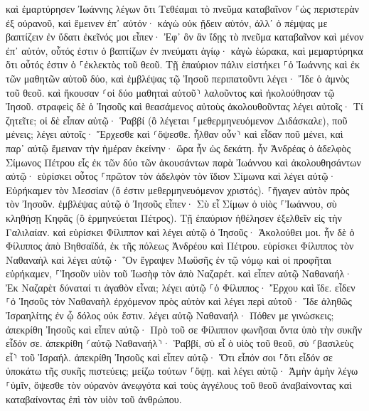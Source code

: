 \documentclass[twoside, 9pt]{extreport}
\begin{document}
καὶ ἐμαρτύρησεν Ἰωάννης λέγων ὅτι Τεθέαμαι τὸ πνεῦμα καταβαῖνον ⸀ὡς περιστερὰν ἐξ οὐρανοῦ, καὶ ἔμεινεν ἐπ᾽ αὐτόν· 
κἀγὼ οὐκ ᾔδειν αὐτόν, ἀλλ᾽ ὁ πέμψας με βαπτίζειν ἐν ὕδατι ἐκεῖνός μοι εἶπεν· Ἐφ᾽ ὃν ἂν ἴδῃς τὸ πνεῦμα καταβαῖνον καὶ μένον ἐπ᾽ αὐτόν, οὗτός ἐστιν ὁ βαπτίζων ἐν πνεύματι ἁγίῳ· 
κἀγὼ ἑώρακα, καὶ μεμαρτύρηκα ὅτι οὗτός ἐστιν ὁ ⸀ἐκλεκτὸς τοῦ θεοῦ. 
Τῇ ἐπαύριον πάλιν εἱστήκει ⸀ὁ Ἰωάννης καὶ ἐκ τῶν μαθητῶν αὐτοῦ δύο, 
καὶ ἐμβλέψας τῷ Ἰησοῦ περιπατοῦντι λέγει· Ἴδε ὁ ἀμνὸς τοῦ θεοῦ. 
καὶ ἤκουσαν ⸂οἱ δύο μαθηταὶ αὐτοῦ⸃ λαλοῦντος καὶ ἠκολούθησαν τῷ Ἰησοῦ. 
στραφεὶς δὲ ὁ Ἰησοῦς καὶ θεασάμενος αὐτοὺς ἀκολουθοῦντας λέγει αὐτοῖς· Τί ζητεῖτε; οἱ δὲ εἶπαν αὐτῷ· Ῥαββί (ὃ λέγεται ⸀μεθερμηνευόμενον Διδάσκαλε), ποῦ μένεις; 
λέγει αὐτοῖς· Ἔρχεσθε καὶ ⸂ὄψεσθε. ἦλθαν οὖν⸃ καὶ εἶδαν ποῦ μένει, καὶ παρ᾽ αὐτῷ ἔμειναν τὴν ἡμέραν ἐκείνην· ὥρα ἦν ὡς δεκάτη. 
ἦν Ἀνδρέας ὁ ἀδελφὸς Σίμωνος Πέτρου εἷς ἐκ τῶν δύο τῶν ἀκουσάντων παρὰ Ἰωάννου καὶ ἀκολουθησάντων αὐτῷ· 
εὑρίσκει οὗτος ⸀πρῶτον τὸν ἀδελφὸν τὸν ἴδιον Σίμωνα καὶ λέγει αὐτῷ· Εὑρήκαμεν τὸν Μεσσίαν (ὅ ἐστιν μεθερμηνευόμενον χριστός). 
⸀ἤγαγεν αὐτὸν πρὸς τὸν Ἰησοῦν. ἐμβλέψας αὐτῷ ὁ Ἰησοῦς εἶπεν· Σὺ εἶ Σίμων ὁ υἱὸς ⸀Ἰωάννου, σὺ κληθήσῃ Κηφᾶς (ὃ ἑρμηνεύεται Πέτρος). 
Τῇ ἐπαύριον ἠθέλησεν ἐξελθεῖν εἰς τὴν Γαλιλαίαν. καὶ εὑρίσκει Φίλιππον καὶ λέγει αὐτῷ ὁ Ἰησοῦς· Ἀκολούθει μοι. 
ἦν δὲ ὁ Φίλιππος ἀπὸ Βηθσαϊδά, ἐκ τῆς πόλεως Ἀνδρέου καὶ Πέτρου. 
εὑρίσκει Φίλιππος τὸν Ναθαναὴλ καὶ λέγει αὐτῷ· Ὃν ἔγραψεν Μωϋσῆς ἐν τῷ νόμῳ καὶ οἱ προφῆται εὑρήκαμεν, ⸀Ἰησοῦν υἱὸν τοῦ Ἰωσὴφ τὸν ἀπὸ Ναζαρέτ. 
καὶ εἶπεν αὐτῷ Ναθαναήλ· Ἐκ Ναζαρὲτ δύναταί τι ἀγαθὸν εἶναι; λέγει αὐτῷ ⸀ὁ Φίλιππος· Ἔρχου καὶ ἴδε. 
εἶδεν ⸀ὁ Ἰησοῦς τὸν Ναθαναὴλ ἐρχόμενον πρὸς αὐτὸν καὶ λέγει περὶ αὐτοῦ· Ἴδε ἀληθῶς Ἰσραηλίτης ἐν ᾧ δόλος οὐκ ἔστιν. 
λέγει αὐτῷ Ναθαναήλ· Πόθεν με γινώσκεις; ἀπεκρίθη Ἰησοῦς καὶ εἶπεν αὐτῷ· Πρὸ τοῦ σε Φίλιππον φωνῆσαι ὄντα ὑπὸ τὴν συκῆν εἶδόν σε. 
ἀπεκρίθη ⸂αὐτῷ Ναθαναήλ⸃· Ῥαββί, σὺ εἶ ὁ υἱὸς τοῦ θεοῦ, σὺ ⸂βασιλεὺς εἶ⸃ τοῦ Ἰσραήλ. 
ἀπεκρίθη Ἰησοῦς καὶ εἶπεν αὐτῷ· Ὅτι εἶπόν σοι ⸀ὅτι εἶδόν σε ὑποκάτω τῆς συκῆς πιστεύεις; μείζω τούτων ⸀ὄψῃ. 
καὶ λέγει αὐτῷ· Ἀμὴν ἀμὴν λέγω ⸀ὑμῖν, ὄψεσθε τὸν οὐρανὸν ἀνεῳγότα καὶ τοὺς ἀγγέλους τοῦ θεοῦ ἀναβαίνοντας καὶ καταβαίνοντας ἐπὶ τὸν υἱὸν τοῦ ἀνθρώπου. 
\end{document}
